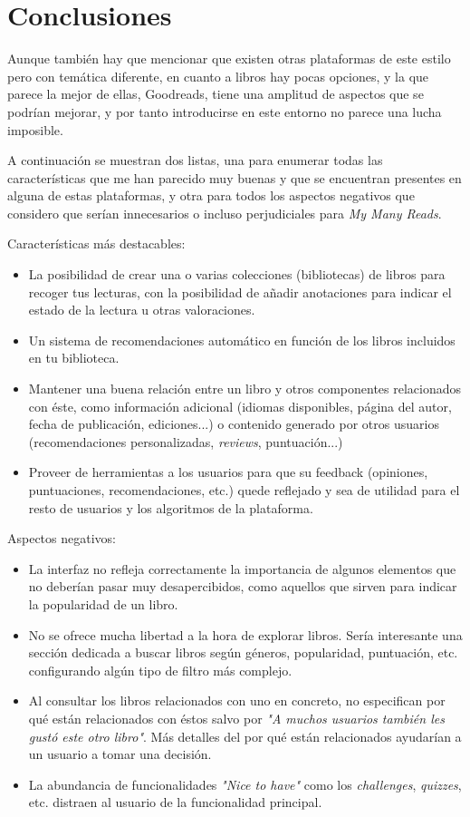 \section{Conclusiones}

Aunque también hay que mencionar que existen otras plataformas de este estilo pero con temática diferente, en cuanto a libros hay pocas opciones, y la que parece la mejor de ellas, Goodreads, tiene una amplitud de aspectos que se podrían mejorar, y por tanto introducirse en este entorno no parece una lucha imposible.

A continuación se muestran dos listas, una para enumerar todas las características que me han parecido muy buenas y que se encuentran presentes en alguna de estas plataformas, y otra para todos los aspectos negativos que considero que serían innecesarios o incluso perjudiciales para \textit{My Many Reads}.

Características más destacables:

\begin{itemize}
\item La posibilidad de crear una o varias colecciones (bibliotecas) de libros para recoger tus lecturas, con la posibilidad de añadir anotaciones para indicar el estado de la lectura u otras valoraciones.
\item Un sistema de recomendaciones automático en función de los libros incluidos en tu biblioteca.
\item Mantener una buena relación entre un libro y otros componentes relacionados con éste, como información adicional (idiomas disponibles, página del autor, fecha de publicación, ediciones...) o contenido generado por otros usuarios (recomendaciones personalizadas, \textit{reviews}, puntuación...)
\item Proveer de herramientas a los usuarios para que su feedback (opiniones, puntuaciones, recomendaciones, etc.) quede reflejado y sea de utilidad para el resto de usuarios y los algoritmos de la plataforma.
\end{itemize}

Aspectos negativos:

\begin{itemize}
\item La interfaz no refleja correctamente la importancia de algunos elementos que no deberían pasar muy desapercibidos, como aquellos que sirven para indicar la popularidad de un libro.
\item No se ofrece mucha libertad a la hora de explorar libros. Sería interesante una sección dedicada a buscar libros según géneros, popularidad, puntuación, etc. configurando algún tipo de filtro más complejo.
\item Al consultar los libros relacionados con uno en concreto, no especifican por qué están relacionados con éstos salvo por \textit{"A muchos usuarios también les gustó este otro libro"}. Más detalles del por qué están relacionados ayudarían a un usuario a tomar una decisión.
\item La abundancia de funcionalidades \textit{"Nice to have"} como los \textit{challenges}, \textit{quizzes}, etc. distraen al usuario de la funcionalidad principal.
\end{itemize}
